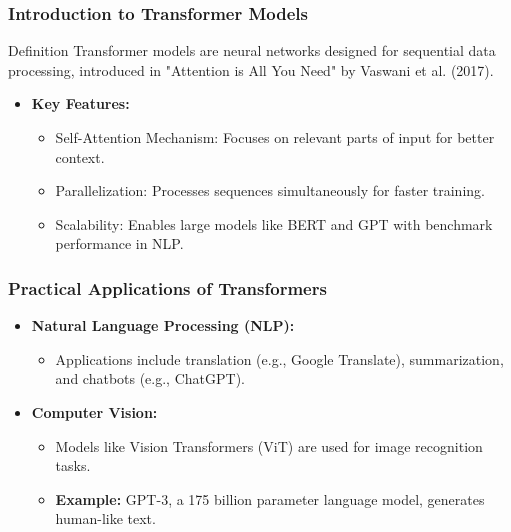 \documentclass[aspectratio=169]{beamer}
\begin{document}
\begin{frame}[fragile]
    \frametitle{Introduction to Transformer Models}
    \begin{block}{Definition}
        Transformer models are neural networks designed for sequential data processing, introduced in "Attention is All You Need" by Vaswani et al. (2017).
    \end{block}
  
    \begin{itemize}
        \item \textbf{Key Features:}
        \begin{itemize}
            \item Self-Attention Mechanism: Focuses on relevant parts of input for better context.
            \item Parallelization: Processes sequences simultaneously for faster training.
            \item Scalability: Enables large models like BERT and GPT with benchmark performance in NLP.
        \end{itemize}
    \end{itemize}
\end{frame}

\begin{frame}[fragile]
    \frametitle{Practical Applications of Transformers}
    \begin{itemize}
        \item \textbf{Natural Language Processing (NLP):}
        \begin{itemize}
            \item Applications include translation (e.g., Google Translate), summarization, and chatbots (e.g., ChatGPT).
        \end{itemize}
        
        \item \textbf{Computer Vision:}
        \begin{itemize}
            \item Models like Vision Transformers (ViT) are used for image recognition tasks.
            \item \textbf{Example:} GPT-3, a 175 billion parameter language model, generates human-like text.
        \end{itemize}
    \end{itemize}
\end{frame}
\end{document}
